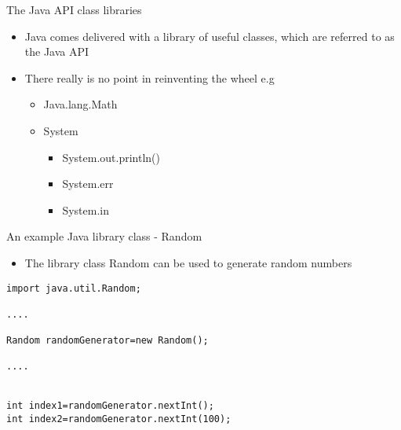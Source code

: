 \documentclass{beamer}
\begin{document}
\begin{frame}

The Java API class libraries

\begin{itemize}
\item Java comes delivered with a library of useful classes, which are referred to as the Java API 
\item There really is no point in reinventing the wheel e.g

\begin{itemize}
\item Java.lang.Math
\item System

\begin{itemize}
\item System.out.println()
\item System.err
\item System.in
\end{itemize}
\end{itemize}
\end{itemize}

\end{frame} 

\begin{frame}[fragile]

An example Java library class - Random

\begin{itemize}
\item The library class Random can be used to generate random numbers
\end{itemize}

\begin{block}{}
\begin{lstlisting}
import java.util.Random;

....

Random randomGenerator=new Random();

....
 

int index1=randomGenerator.nextInt();
int index2=randomGenerator.nextInt(100); 
\end{lstlisting}
\end{block}

\end{frame}
\end{document}
